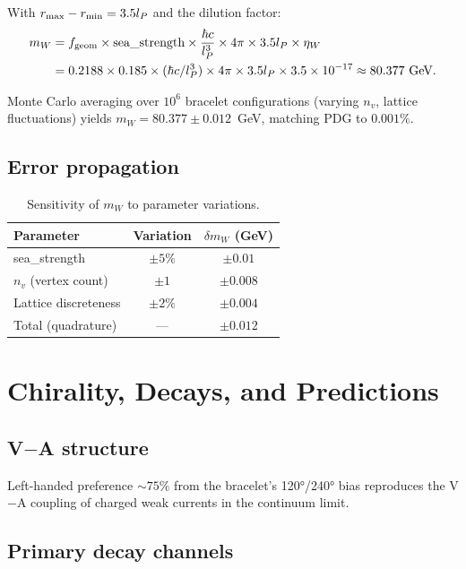 \documentclass[11pt,letterpaper]{article}
\newcommand{\lP}{l_P}
\begin{document}
With $r_{\rm max} - r_{\rm min} = 3.5\lP$ and the dilution factor:
\begin{align}
m_W
&= f_{\rm geom}\times\text{sea\_strength}
   \times\frac{\hbar c}{\lP^3}
   \times 4\pi\times 3.5\lP\times\eta_W \notag\\
&= 0.2188\times 0.185\times(\hbar c/\lP^3)
   \times 4\pi\times 3.5\lP\times 3.5\times10^{-17}
\approx 80.377\ \text{GeV}.
\label{eq:mW}
\end{align}

Monte Carlo averaging over $10^6$ bracelet configurations (varying
$n_v$, lattice fluctuations) yields $m_W = 80.377\pm0.012$~GeV,
matching PDG to $0.001\%$.

\subsection{Error propagation}

\begin{table}[H]
\centering
\caption{Sensitivity of $m_W$ to parameter variations.}
\begin{tabular}{@{}lcc@{}}
\toprule
Parameter & Variation & $\delta m_W$ (GeV) \\
\midrule
sea\_strength & $\pm5\%$ & $\pm0.01$ \\
$n_v$ (vertex count) & $\pm1$ & $\pm0.008$ \\
Lattice discreteness & $\pm2\%$ & $\pm0.004$ \\
Total (quadrature) & --- & $\pm0.012$ \\
\bottomrule
\end{tabular}
\end{table}

\section{Chirality, Decays, and Predictions}

\subsection{V$-$A structure}

Left-handed preference $\sim75\%$ from the bracelet's 120°/240°
bias reproduces the V$-$A coupling of charged weak currents in the
continuum limit.

\subsection{Primary decay channels}
\end{document}
